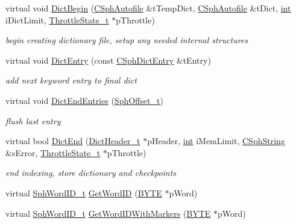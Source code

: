 \begin{DoxyCompactItemize}
virtual void \hyperlink{classCSphDictKeywords_a2863f18e86bfd28265a1d5c66a5486c6}{Dict\-Begin} (\hyperlink{classCSphAutofile}{C\-Sph\-Autofile} \&t\-Temp\-Dict, \hyperlink{classCSphAutofile}{C\-Sph\-Autofile} \&t\-Dict, \hyperlink{sphinxexpr_8cpp_a4a26e8f9cb8b736e0c4cbf4d16de985e}{int} i\-Dict\-Limit, \hyperlink{structThrottleState__t}{Throttle\-State\-\_\-t} $\ast$p\-Throttle)
\begin{DoxyCompactList}\small\item\em begin creating dictionary file, setup any needed internal structures \end{DoxyCompactList}\item 
virtual void \hyperlink{classCSphDictKeywords_a0d41d8455da3ab719d31e4273bec3d06}{Dict\-Entry} (const \hyperlink{structCSphDictEntry}{C\-Sph\-Dict\-Entry} \&t\-Entry)
\begin{DoxyCompactList}\small\item\em add next keyword entry to final dict \end{DoxyCompactList}\item 
virtual void \hyperlink{classCSphDictKeywords_af5d107a4490a398e614bd927530db10b}{Dict\-End\-Entries} (\hyperlink{sphinx_8h_a0fb3b64afebef33c61367714754eaa90}{Sph\-Offset\-\_\-t})
\begin{DoxyCompactList}\small\item\em flush last entry \end{DoxyCompactList}\item 
virtual bool \hyperlink{classCSphDictKeywords_a272cd1168c539a4b5ce44dd23ba0870b}{Dict\-End} (\hyperlink{structDictHeader__t}{Dict\-Header\-\_\-t} $\ast$p\-Header, \hyperlink{sphinxexpr_8cpp_a4a26e8f9cb8b736e0c4cbf4d16de985e}{int} i\-Mem\-Limit, \hyperlink{structCSphString}{C\-Sph\-String} \&s\-Error, \hyperlink{structThrottleState__t}{Throttle\-State\-\_\-t} $\ast$p\-Throttle)
\begin{DoxyCompactList}\small\item\em end indexing, store dictionary and checkpoints \end{DoxyCompactList}\item 
virtual \hyperlink{sphinx_8h_a80a94d5984fdf9214a98f3e5e65df963}{Sph\-Word\-I\-D\-\_\-t} \hyperlink{classCSphDictKeywords_a3173925482330c0c3d62ccffe7877d2f}{Get\-Word\-I\-D} (\hyperlink{sphinxstd_8h_a4ae1dab0fb4b072a66584546209e7d58}{B\-Y\-T\-E} $\ast$p\-Word)
\item 
virtual \hyperlink{sphinx_8h_a80a94d5984fdf9214a98f3e5e65df963}{Sph\-Word\-I\-D\-\_\-t} \hyperlink{classCSphDictKeywords_ab532ec08ebb597cc237145f21eaa6b57}{Get\-Word\-I\-D\-With\-Markers} (\hyperlink{sphinxstd_8h_a4ae1dab0fb4b072a66584546209e7d58}{B\-Y\-T\-E} $\ast$p\-Word)

\end{DoxyCompactItemize}
